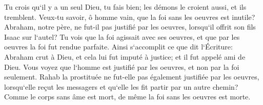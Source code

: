 \verse Tu crois qu`il y a un seul Dieu, tu fais bien; les démons le croient aussi, et ils tremblent. 
\verse Veux-tu savoir, ô homme vain, que la foi sans les oeuvres est inutile? 
\verse Abraham, notre père, ne fut-il pas justifié par les oeuvres, lorsqu`il offrit son fils Isaac sur l`autel? 
\verse Tu vois que la foi agissait avec ses oeuvres, et que par les oeuvres la foi fut rendue parfaite. 
\verse Ainsi s`accomplit ce que dit l`Écriture: Abraham crut à Dieu, et cela lui fut imputé à justice; et il fut appelé ami de Dieu. 
\verse Vous voyez que l`homme est justifié par les oeuvres, et non par la foi seulement. 
\verse Rahab la prostituée ne fut-elle pas également justifiée par les oeuvres, lorsqu`elle reçut les messagers et qu`elle les fit partir par un autre chemin? 
\verse Comme le corps sans âme est mort, de même la foi sans les oeuvres est morte. 

